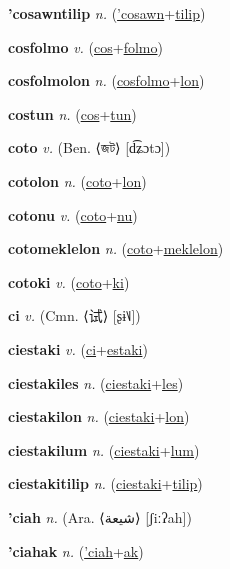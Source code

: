 \textbf{\hypertarget{'cosawntilip}{'cosawntilip}} \textit{n.} (\hyperlink{'cosawn}{'cosawn}+\allowbreak \hyperlink{tilip}{tilip})


\textbf{\hypertarget{cosfolmo}{cosfolmo}} \textit{v.} (\hyperlink{cos}{cos}+\allowbreak \hyperlink{folmo}{folmo})


\textbf{\hypertarget{cosfolmolon}{cosfolmolon}} \textit{n.} (\hyperlink{cosfolmo}{cosfolmo}+\allowbreak \hyperlink{lon}{lon})


\textbf{\hypertarget{costun}{costun}} \textit{n.} (\hyperlink{cos}{cos}+\allowbreak \hyperlink{tun}{tun})


\textbf{\hypertarget{coto}{coto}} \textit{v.} (Ben. ⟨{\bengali{}জট}⟩ [d͡ʑɔtɔ])


\textbf{\hypertarget{cotolon}{cotolon}} \textit{n.} (\hyperlink{coto}{coto}+\allowbreak \hyperlink{lon}{lon})


\textbf{\hypertarget{cotonu}{cotonu}} \textit{v.} (\hyperlink{coto}{coto}+\allowbreak \hyperlink{nu}{nu})


\textbf{\hypertarget{cotomeklelon}{cotomeklelon}} \textit{n.} (\hyperlink{coto}{coto}+\allowbreak \hyperlink{meklelon}{meklelon})


\textbf{\hypertarget{cotoki}{cotoki}} \textit{v.} (\hyperlink{coto}{coto}+\allowbreak \hyperlink{ki}{ki})


\textbf{\hypertarget{ci}{ci}} \textit{v.} (Cmn. ⟨{\chinese{}试}⟩ [ʂɨ˥˩])


\textbf{\hypertarget{ciestaki}{ciestaki}} \textit{v.} (\hyperlink{ci}{ci}+\allowbreak \hyperlink{estaki}{estaki})


\textbf{\hypertarget{ciestakiles}{ciestakiles}} \textit{n.} (\hyperlink{ciestaki}{ciestaki}+\allowbreak \hyperlink{les}{les})


\textbf{\hypertarget{ciestakilon}{ciestakilon}} \textit{n.} (\hyperlink{ciestaki}{ciestaki}+\allowbreak \hyperlink{lon}{lon})


\textbf{\hypertarget{ciestakilum}{ciestakilum}} \textit{n.} (\hyperlink{ciestaki}{ciestaki}+\allowbreak \hyperlink{lum}{lum})


\textbf{\hypertarget{ciestakitilip}{ciestakitilip}} \textit{n.} (\hyperlink{ciestaki}{ciestaki}+\allowbreak \hyperlink{tilip}{tilip})


\textbf{\hypertarget{'ciah}{'ciah}} \textit{n.} (Ara. ⟨{\arabics{}شيعة‎}⟩ [ʃiːʔah])


\textbf{\hypertarget{'ciahak}{'ciahak}} \textit{n.} (\hyperlink{'ciah}{'ciah}+\allowbreak \hyperlink{ak}{ak})


